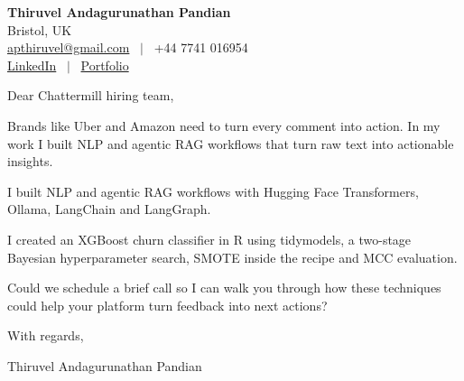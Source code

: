 \documentclass[11pt,a4paper]{article}
\begin{document}
\raggedright
\pagestyle{empty}

\begin{center}
    {\LARGE \color{linkblue} \textbf{Thiruvel Andagurunathan Pandian}}\\[0.2cm]
    Bristol, UK \\
    \href{mailto:apthiruvel@gmail.com}{apthiruvel@gmail.com} \ $|$ \ +44 7741 016954 \\
\href{https://www.linkedin.com/in/thiruvel-a-p/}{LinkedIn} \ $|$ \ \href{https://thiruvel-ap.github.io/PersonalPortfolio/}{Portfolio}
\end{center}

\vspace{0.4cm}

\noindent
Dear Chattermill hiring team,

Brands like Uber and Amazon need to turn every comment into action. In my work I built NLP and agentic RAG workflows that turn raw text into actionable insights.

I built NLP and agentic RAG workflows with Hugging Face Transformers, Ollama, LangChain and LangGraph.

I created an XGBoost churn classifier in R using tidymodels, a two-stage Bayesian hyperparameter search, SMOTE inside the recipe and MCC evaluation.

Could we schedule a brief call so I can walk you through how these techniques could help your platform turn feedback into next actions?

\vspace{0.5cm}

With regards,

Thiruvel Andagurunathan Pandian
\end{document}

